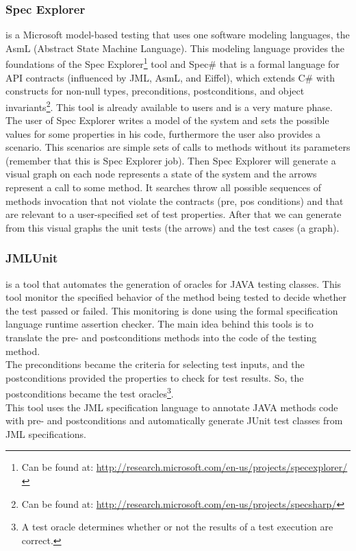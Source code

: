 \documentclass[10pt, conference, compsocconf]{IEEEtran}
\begin{document}
\subsubsection{\textbf{Spec Explorer}} is a Microsoft model-based testing that uses one software modeling languages, the AsmL (Abstract State Machine Language).
This modeling language provides the foundations of the Spec Explorer\footnote{Can be found at: \url{http://research.microsoft.com/en-us/projects/specexplorer/}} tool
and Spec\# that is a formal language for API contracts (influenced by JML, AsmL, and Eiffel), which extends C\# with constructs for non-null types,
preconditions, postconditions, and object invariants\footnote{Can be found at: \url{http://research.microsoft.com/en-us/projects/specsharp/}}.
This tool is already available to users and is a very mature phase.\\
\indent The user of Spec Explorer writes a model of the system and sets the possible values for some properties in his code, furthermore the user also provides a scenario.
This scenarios are simple sets of calls to methods without its parameters (remember that this is Spec Explorer job).
Then Spec Explorer will generate a visual graph on each node represents a state of the system and the arrows represent a call to some method.
It searches throw all possible sequences of methods invocation that not violate the contracts (pre, pos conditions) and
that are relevant to a user-specified set of test properties. After that we can generate from this visual graphs the unit tests (the arrows) and the
test cases (a graph).

\subsubsection{\textbf{JMLUnit}\cite{Cheon04thejml}} is a tool that automates the generation of oracles for JAVA testing classes. This tool
monitor the specified behavior of the method being tested to decide whether the test passed or failed.
This monitoring is done using the formal specification language runtime assertion checker.
The main idea behind this tools is to translate the pre- and postconditions methods into the code of the testing method.\\
The preconditions became the criteria for selecting test inputs, and the postconditions provided the properties to check for
test results. So, the postconditions became the test oracles\footnote{A test oracle determines whether or not the results of a test
execution are correct\cite{Peters95generatinga}.}.\\
This tool uses the JML\cite{Burdy03anoverview} specification language to annotate JAVA methods code with pre- and postconditions and
automatically generate JUnit test classes from JML specifications.
\end{document}
